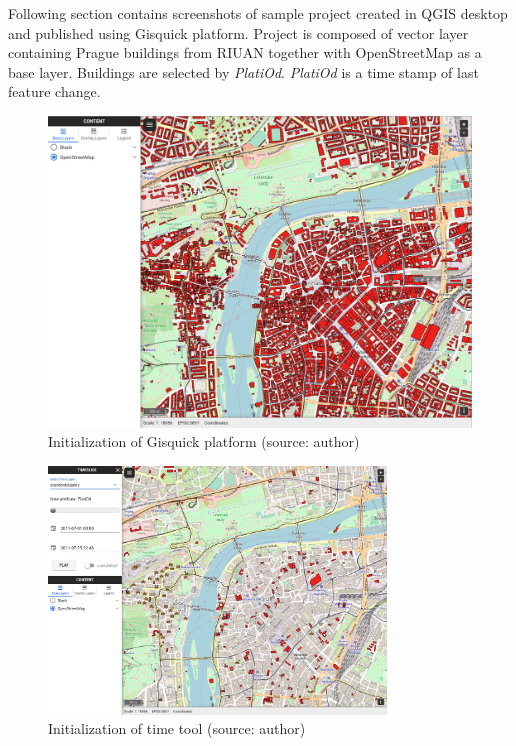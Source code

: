 Following section contains screenshots of sample project created in QGIS 
desktop and published using Gisquick platform. Project is composed of
vector layer containing Prague buildings from RIUAN together with OpenStreetMap
as a base layer. Buildings are selected by \textit{PlatiOd}. \textit{PlatiOd} 
is a time stamp of last feature change. 

\bigskip
\begin{figure}[h!]
	\centering
	\includegraphics[width=1\textwidth]{../img/gisquick-open.png}
	\caption{Initialization of Gisquick platform (source: author)}
	\label{fig:gisquick-open}
\end{figure}

\newpage

\begin{figure}[h!]
	\centering
	\includegraphics[width=0.8\textwidth]{../img/prague-init.png}
	\caption{Initialization of time tool (source: author)}
	\label{fig:prague-init}
\end{figure}

